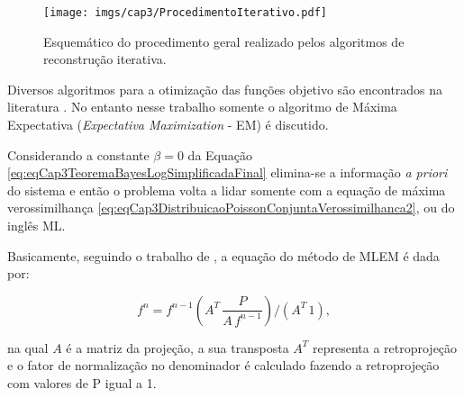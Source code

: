{{\begin{figure}[H]
	\caption{Esquemático do procedimento geral realizado pelos algoritmos de reconstrução iterativa.}
	\begin{center}
		\texttt{[image: imgs/cap3/ProcedimentoIterativo.pdf]}
	\end{center}
	\label{fig:imgCap3ProcedimentoIterativo}
\end{figure}

Diversos algoritmos para a otimização das funções objetivo são encontrados na literatura \cite{Fessler2000handbook,das2011penalized,zeng2010medical,sidky2014iterative,xu2015statistical,zheng2018detector}. No entanto nesse trabalho somente o algoritmo de Máxima Expectativa (\textit{Expectativa Maximization} - \acs{EM}) é discutido.

Considerando a constante $\beta = 0$ da Equação \ref{eq:eqCap3TeoremaBayesLogSimplificadaFinal} elimina-se a informação \textit{a priori} do sistema e então o problema volta a lidar somente com a equação de máxima verossimilhança \eqref{eq:eqCap3DistribuicaoPoissonConjuntaVerossimilhanca2}, ou do inglês \acs{ML}.  

Basicamente, seguindo o trabalho de , a equação do método de \acs{MLEM} é dada por:

\begin{equation}
f^{n} = f^{n-1}  \left(A^{T} \, \dfrac{P}{A \, f^{n-1}}\right)   /    (A^{T}\,1),
\label{eq:eqCap3MLEM}
\end{equation}

\noindent na qual $A$ é a matriz da projeção, a sua transposta $A^{T}$ representa a retroprojeção e o fator de normalização no denominador é calculado fazendo a retroprojeção com valores de P igual a 1.

%
%
%
%

}}
